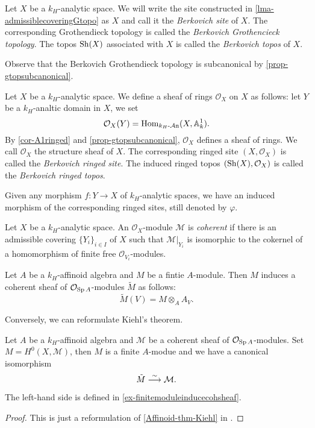 \begin{definition}
    Let $X$ be a $k_H$-analytic space. We will write the site constructed in \cref{lma-admissiblecoveringGtopo} as $X$ and call it the \emph{Berkovich site} of $X$. The corresponding Grothendieck topology is called the \emph{Berkovich Grothencieck topology}.
    The topos $\mathrm{Sh}(X)$ associated with $X$ is called the \emph{Berkovich topos} of $X$.
\end{definition}
Observe that the Berkovich Grothendieck topology is subcanonical by \cref{prop-gtopsubcanonical}.

\begin{definition}
    Let $X$ be a $k_H$-analytic space.
    We define a sheaf of rings $\mathcal{O}_X$ on $X$ as follows: let $Y$ be a $k_H$-analtic domain in $X$, we set 
    \[
        \mathcal{O}_X(Y)=\operatorname{Hom}_{k_H\text{-}\mathcal{A}\mathrm{n}}(X,\mathbb{A}^1_k).
    \]
    By \cref{cor-A1ringed} and \cref{prop-gtopsubcanonical}, $\mathcal{O}_X$ defines a sheaf of rings. We call $\mathcal{O}_X$ the structure sheaf of $X$. The corresponding ringed site $(X,\mathcal{O}_X)$ is called the \emph{Berkovich ringed site}. The induced ringed topos $(\mathrm{Sh}(X),\mathcal{O}_X)$ is called the \emph{Berkovich ringed topos}.

    Given any morphism $f:Y\rightarrow X$ of $k_H$-analytic spaces, we have an induced morphism of the corresponding ringed sites, still denoted by $\varphi$.
\end{definition}

\begin{definition}
    Let $X$ be a $k_H$-analytic space. An $\mathcal{O}_X$-module $\mathcal{M}$ is \emph{coherent} if there is an admissible covering $\{Y_i\}_{i\in I}$ of $X$ such that $\mathcal{M}|_{Y_i}$ is isomorphic to the cokernel of a homomorphism of finite free $\mathcal{O}_{V_i}$-modules.
\end{definition}

\begin{example}\label{ex-finitemoduleinducecohsheaf}
    Let $A$ be a $k_H$-affinoid algebra and $M$ be a fintie $A$-module. Then $M$ induces a coherent sheaf of $\mathcal{O}_{\operatorname{Sp} A}$-modules $\tilde{M}$ as follows:
    \[
        \tilde{M}(V)=M\otimes_A A_V.  
    \]
\end{example}

Conversely, we can reformulate Kiehl's theorem.
\begin{thm}\label{thm-Kiehlcoh}
    Let $A$ be a $k_H$-affinoid algebra and $\mathcal{M}$ be a coherent sheaf of $\mathcal{O}_{\operatorname{Sp} A}$-modules. Set $M=H^0(X,\mathcal{M})$, then $M$ is a finite $A$-modue and we have a canonical isomorphism
    \[
        \tilde{M}\stackrel{\sim}{\longrightarrow} \mathcal{M}.  
    \]
\end{thm}
The left-hand side is defined in \cref{ex-finitemoduleinducecohsheaf}.
\begin{proof}
    This is just a reformulation of \cref{Affinoid-thm-Kiehl} in .
\end{proof}

